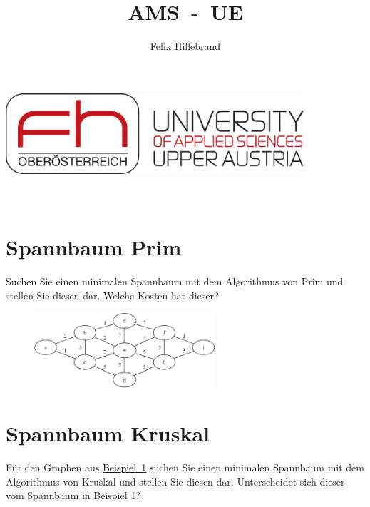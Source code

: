 \documentclass[a4paper,11pt]{report}
\author{Felix Hillebrand}
\newcommand{\coverpage}{
    \thispagestyle{cover}
    \pagenumbering{roman} %
    \begin{center}
        {\includegraphics[height=3cm]{fh-logo}}\\[1cm]
        {\LARGE \thetitle}\\[0.5cm]
        {\large \theauthor}\\
    \end{center}
    \tableofcontents
    \clearpage
}
\begin{document}

    \title{AMS~-~UE}
    \coverpage

    \clearpage
    \pagestyle{main}


    \chapter{Spannbaum Prim}
    \label{ch:spbprim}
    Suchen Sie einen minimalen Spannbaum mit dem Algorithmus von Prim und stellen Sie diesen dar.
    Welche Kosten hat dieser?

    \begin{figure}[H]
        \centering
        \includegraphics[width=0.6\textwidth]{a01a_graph}
        \label{fig:a01_graph}
    \end{figure}

    \newpage

    \chapter{Spannbaum Kruskal}
    \label{ch:sbkruskal}
    Für den Graphen aus \hyperref[fig:a01_graph]{Beispiel~1} suchen Sie einen minimalen Spannbaum mit dem Algorithmus von
    Kruskal und stellen Sie diesen dar. Unterscheidet sich dieser vom Spannbaum in Beispiel 1?

    \newpage
\end{document}
